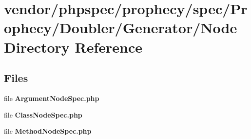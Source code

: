 \section{vendor/phpspec/prophecy/spec/\+Prophecy/\+Doubler/\+Generator/\+Node Directory Reference}
\label{dir_8a022a26d92ee160135a260f1f9ecc61}
\subsection*{Files}
\begin{DoxyCompactItemize}
\item 
file {\bf Argument\+Node\+Spec.\+php}
\item 
file {\bf Class\+Node\+Spec.\+php}
\item 
file {\bf Method\+Node\+Spec.\+php}
\end{DoxyCompactItemize}
